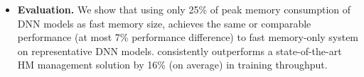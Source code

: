 \begin{itemize}[leftmargin=*]

\item \textbf{Evaluation.} %
We show that using only \textcolor{check}{25\%} of peak memory consumption of DNN models as fast memory size, \name achieves the same or comparable performance (at most \textcolor{check}{7\%} performance difference) to   fast memory-only system on representative DNN models. \name consistently outperforms a state-of-the-art HM management solution by \textcolor{check}{16\%} (on average) in training throughput.

 
\end{itemize}





\begin{comment}
CPU for machine learning. 

We focus on CPU as the training platform because of following reasons:
(1) The widespread deployment of CPUs makes this hardware platform an attractive target for machine learning model training. 
(2) The optimizations on GPU lack of generality. 
(3) In terms of programmability, porting the original
code to GPU kernels requires significant programming efforts; 
(4) GPU has strong bias towards certain application.
Existing effort has been made in academic and industry to optimize machine learning training on widely available CPU based architecture. Adam~\cite{Chilimbi:2014:PAB:2685048.2685094} from Microsoft. Intel MKL-DNN\cite{intelMKL} has been proposed to accelerate machine learning training. 

\end{comment}